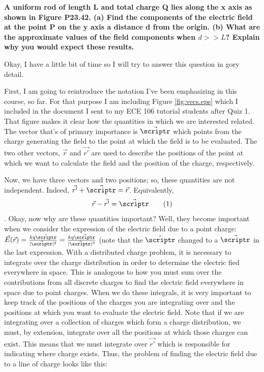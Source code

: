\begin{homeworkProblem}[Problem 23.42]

\textbf{A uniform rod of length L and total charge Q lies along the x axis as shown in Figure P23.42. (a) Find the components of the electric field at the point P on the y axis a distance d from the origin. (b) What are the approximate values of the field components when $d >>L$? Explain why you would expect these results.}

Okay, I have a little bit of time so I will try to answer this question in gory detail.

First, I am going to reintroduce the notation I've been emphasizing in this course, so far. For that purpose I am including Figure \ref{fig:vecs.eps} which I included in the document I sent to my ECE 106 tutorial students after Quiz 1. That figure makes it clear how the quantities in which we are interested related. The vector that's of primary importance is $\vec{\scriptr}$ which points from the charge generating the field to the point at which the field is to be evaluated. The two other vectors, $\vec{r}$ and $\vec{r'}$ are used to describe the positions of the point at which we want to calculate the field and the position of the charge, respectively.

Now, we have three vectors and two positions; so, these quantities are not independent. Indeed, $\vec{r'}+\vec{\scriptr} = \vec{r}$. Equivalently, \[\vec{r}-\vec{r'} = \vec{\scriptr} \addtag \]. Okay, now why are these quantities important? Well, they become important when we consider the expression of the electric field due to a point charge: $\vec{E}(\vec{r}) = \frac{k q  \hat{\scriptr}}{|\vec{\scriptr}|^2} = \frac{k q  \vec{\scriptr}}{|\vec{\scriptr}|^3}$ (note that the $\hat{\scriptr}$ changed to a $\vec{\scriptr}$ in the last expression. With a distributed charge problem, it is necessary to integrate over the charge distribution in order to determine the electric fied everywhere in space. This is analogous to how you must sum over the contributions from all discrete charges to find the electric field everywhere in space due to point charges. When we do these integrals, it is very important to keep track of the positions of the charges you are integrating over and the positions at which you want to evaluate the electric field. Note that if we are integrating over a collection of charges which form a charge distribution, we must, by extension, integrate over all the positions at which those charges can exist. This means that we must integrate over $\vec{r'}$ which is responsible for indicating where charge exists. Thus, the problem of finding the electric field due to a line of charge looks like this:


\end{homeworkProblem}
